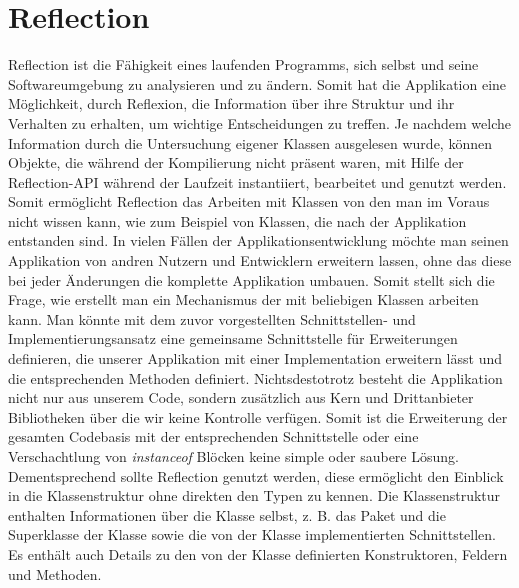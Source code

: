 \section{Reflection} 
\label{sec:reflaction}
Reflection ist die Fähigkeit eines laufenden Programms, sich selbst und seine Softwareumgebung zu analysieren und zu ändern. 
Somit hat die Applikation eine Möglichkeit, durch Reflexion, die Information über ihre Struktur und ihr Verhalten zu erhalten, um wichtige Entscheidungen zu treffen. \newline
Je nachdem welche Information durch die Untersuchung eigener Klassen ausgelesen wurde, können Objekte, die während der Kompilierung nicht präsent waren, mit Hilfe der Reflection-API während der Laufzeit instantiiert, bearbeitet und genutzt werden. Somit ermöglicht Reflection das Arbeiten mit Klassen von den man im Voraus nicht wissen kann, wie zum Beispiel von Klassen, die nach der Applikation entstanden sind.
\bigbreak
In vielen Fällen der Applikationsentwicklung möchte man seinen Applikation von andren Nutzern und Entwicklern erweitern lassen, ohne das diese bei jeder Änderungen die komplette Applikation umbauen. 
Somit stellt sich die Frage, wie erstellt man ein Mechanismus der mit beliebigen Klassen arbeiten kann.
Man könnte mit dem zuvor vorgestellten Schnittstellen- und Implementierungsansatz eine gemeinsame Schnittstelle für Erweiterungen definieren, die unserer Applikation mit einer Implementation erweitern lässt und die entsprechenden Methoden definiert. 
Nichtsdestotrotz besteht die Applikation nicht nur aus unserem Code, sondern zusätzlich aus Kern und Drittanbieter Bibliotheken über die wir keine Kontrolle verfügen.
Somit ist die Erweiterung der gesamten Codebasis mit der entsprechenden Schnittstelle oder eine Verschachtlung von \textit{instanceof} Blöcken keine simple oder saubere Lösung. 
\newline
Dementsprechend sollte Reflection genutzt werden, diese ermöglicht den Einblick in die Klassenstruktur ohne direkten den Typen zu kennen. Die Klassenstruktur enthalten Informationen über die Klasse selbst, z. B. das Paket und die Superklasse der Klasse sowie die von der Klasse implementierten Schnittstellen. Es enthält auch Details zu den von der Klasse definierten Konstruktoren, Feldern und Methoden.
\bigbreak

